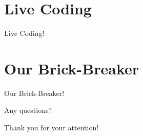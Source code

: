\documentclass{beamer}
\begin{document}
\section{Live Coding}
\begin{frame}
\Huge{\centerline{Live Coding!}}
\end{frame}

\section{Our Brick-Breaker}
\begin{frame}
\Huge{\centerline{Our Brick-Breaker!}}
\end{frame}

\begin{frame}
\Huge{\centerline{Any questions?}}
\end{frame}

\begin{frame}
\Huge{\centerline{Thank you for your attention!}}
\end{frame}

\end{document}
